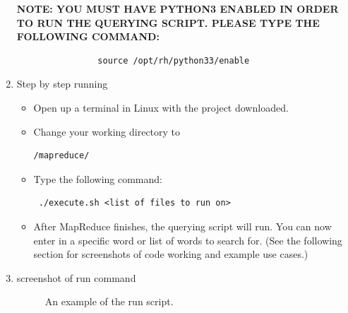 \begin{enumerate}

          \textbf{NOTE:  YOU MUST HAVE PYTHON3 ENABLED IN ORDER TO RUN THE QUERYING SCRIPT. PLEASE TYPE THE FOLLOWING COMMAND:}
                \begin{verbatim}
                source /opt/rh/python33/enable
                \end{verbatim}
    \item Step by step running
        \begin{itemize}
            \item Open up a terminal in Linux with the project downloaded.
            \item Change your working directory to \begin{verbatim}/mapreduce/ \end{verbatim}
            \item Type the following command: \begin{verbatim} ./execute.sh <list of files to run on> \end{verbatim}
            \item After MapReduce finishes, the querying script will run. You can now enter in a specific word or list of words to search for. (See the following section for screenshots of code working and example use cases.)
           \end{itemize}
    \item screenshot of run command \\
    
\begin{figure}[!htbp] 
  \caption{An example of the run script.}
\end{figure}

\end{enumerate}